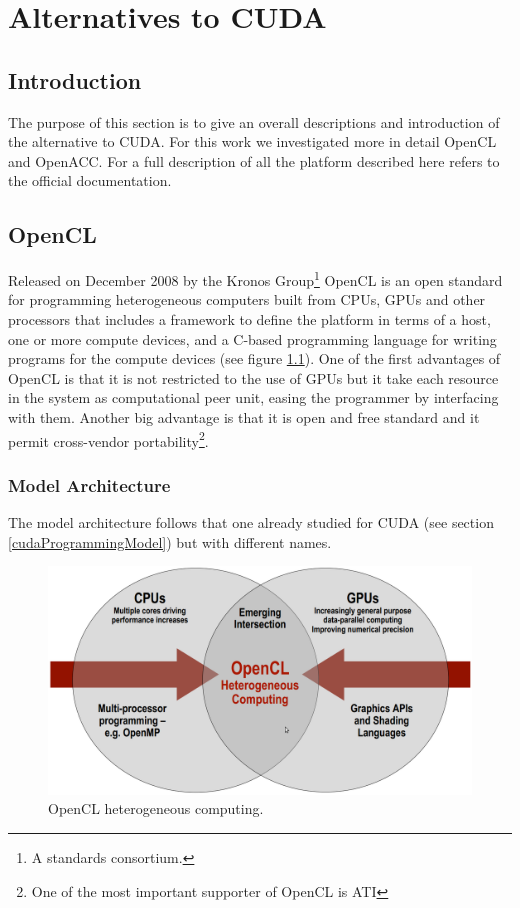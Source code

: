 

\chapter{Alternatives to CUDA}
\section{Introduction}
The purpose of this section is to give an overall descriptions and introduction
of the alternative to CUDA. For this work we investigated more in
detail OpenCL and OpenACC. For a full description of all the platform
described here refers to the official documentation.


\section{OpenCL}
Released on December 2008 by the Kronos Group\footnote{A standards
consortium.} OpenCL is an open standard for programming heterogeneous computers
built from CPUs, GPUs and other processors that includes a framework to define
the platform in terms of a host, one or more compute devices, and a
C-based programming language for writing programs for the compute devices (see
figure \ref{openCL}).
One of the first advantages of OpenCL is that it is not restricted to the use of
GPUs but it take each resource in the system as computational peer unit,  easing
the programmer by interfacing with them. Another big advantage is that it is
open and free standard and it permit cross-vendor portability\footnote{One
of the most important supporter of OpenCL is ATI}.
\subsection{Model Architecture}
The model architecture follows that one already studied for
CUDA (see section \ref{cudaProgrammingModel}) but with different names.
\begin{figure}
\centering
\includegraphics[scale=0.35]{./images/openCL1}
\caption{OpenCL heterogeneous computing.}\label{openCL}
\end{figure}



